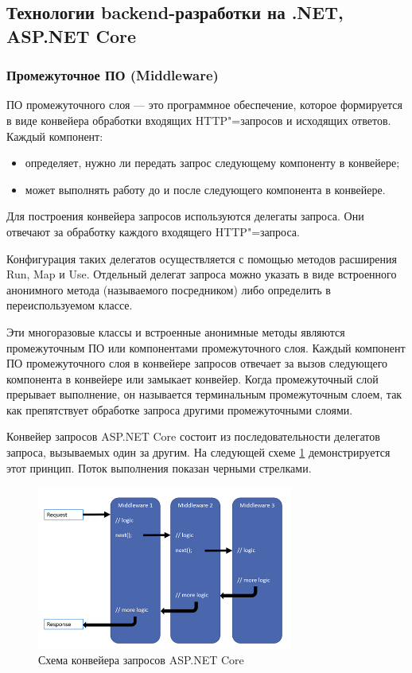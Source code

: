 \subsection{Технологии backend-разработки на .NET, ASP.NET Core}

\subsubsection{Промежуточное ПО (Middleware)}
ПО промежуточного слоя --- это программное обеспечение, которое формируется в виде конвейера обработки входящих HTTP"=запросов и исходящих ответов. Каждый компонент: \cite{Middleware}

\begin{itemize}
	\item{определяет, нужно ли передать запрос следующему компоненту в конвейере;}
	\item{может выполнять работу до и после следующего компонента в конвейере.}
\end{itemize}


Для построения конвейера запросов используются делегаты запроса. Они отвечают за обработку каждого входящего HTTP"=запроса.

Конфигурация таких делегатов осуществляется с помощью методов расширения Run, Map и Use. Отдельный делегат запроса можно указать в виде встроенного анонимного метода (называемого посредником) либо определить в переиспользуемом классе.

Эти многоразовые классы и встроенные анонимные методы являются промежуточным ПО или компонентами промежуточного слоя. Каждый компонент ПО промежуточного слоя в конвейере запросов отвечает за вызов следующего компонента в конвейере или замыкает конвейер. Когда промежуточный слой прерывает выполнение, он называется терминальным промежуточным слоем, так как препятствует обработке запроса другими промежуточными слоями.

Конвейер запросов ASP.NET Core состоит из последовательности делегатов запроса, вызываемых один за другим. На следующей схеме \ref{fig:Middleware} демонстрируется этот принцип. Поток выполнения показан черными стрелками.

\begin{figure}[!h]
    \centering
    \includegraphics[width = 0.75\textwidth]{imgs/middleware.png}
    \caption{Схема конвейера запросов ASP.NET Core}
    \label{fig:Middleware}
\end{figure}

